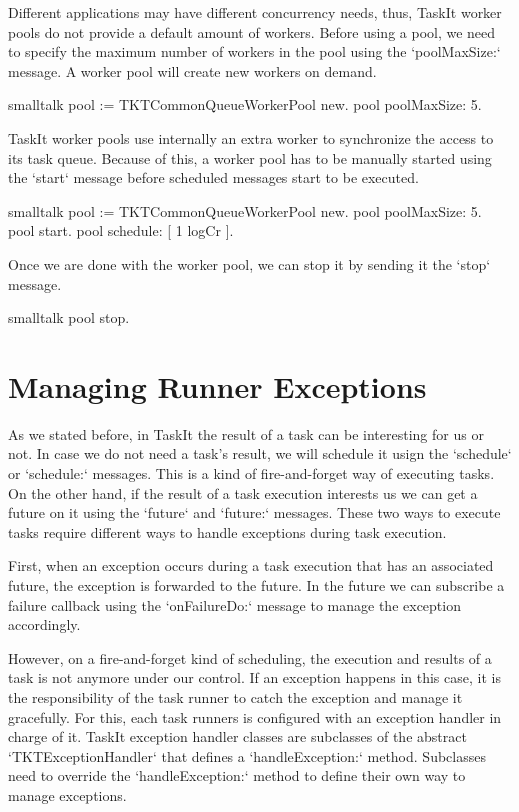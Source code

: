 \documentclass[10pt,twoside,english]{_support/latex/sbabook/sbabook}
\begin{document}
Different applications may have different concurrency needs, thus, TaskIt worker pools do not provide a default amount of workers. Before using a pool, we need to specify the maximum number of workers in the pool using the `poolMaxSize:` message. A worker pool will create new workers on demand. 

\begin{displaycode}{smalltalk}
pool := TKTCommonQueueWorkerPool new.
pool poolMaxSize: 5.
\end{displaycode}

TaskIt worker pools use internally an extra worker to synchronize the access to its task queue. Because of this, a worker pool has to be manually started using the `start` message before scheduled messages start to be executed.

\begin{displaycode}{smalltalk}
pool := TKTCommonQueueWorkerPool new.
pool poolMaxSize: 5.
pool start.
pool schedule: [ 1 logCr ].
\end{displaycode}

Once we are done with the worker pool, we can stop it by sending it the `stop` message.

\begin{displaycode}{smalltalk}
pool stop.
\end{displaycode}
\section{Managing Runner Exceptions}
As we stated before, in TaskIt the result of a task can be interesting for us or not. In case we do not need a task's result, we will schedule it usign the `schedule` or `schedule:` messages. This is a kind of fire-and-forget way of executing tasks. On the other hand, if the result of a task execution interests us we can get a future on it using the `future` and `future:` messages. These two ways to execute tasks require different ways to handle exceptions during task execution.

First, when an exception occurs during a task execution that has an associated future, the exception is forwarded to the future. In the future we can subscribe a failure callback using the `onFailureDo:` message to manage the exception accordingly.

However, on a fire-and-forget kind of scheduling, the execution and results of a task is not anymore under our control. If an exception happens in this case, it is the responsibility of the task runner to catch the exception and manage it gracefully. For this, each task runners is configured with an exception handler in charge of it. TaskIt exception handler classes are subclasses of the abstract `TKTExceptionHandler` that defines a `handleException:` method. Subclasses need to override the `handleException:` method to define their own way to manage exceptions.
\end{document}
